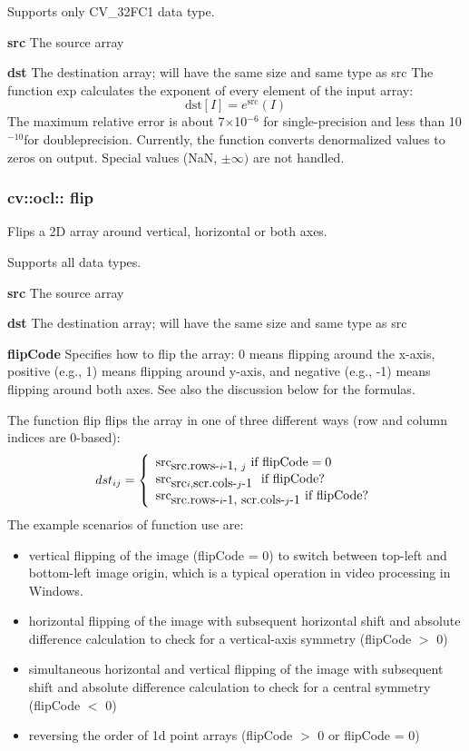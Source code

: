 \documentclass{article}
\begin{document}
Supports only CV{\_}32FC1 data type.

\textbf{src }The source array

\textbf{dst }The destination array; will have the same size and same type as
src The function exp calculates the exponent of every element of the input
array:
\[
\mbox{dst}\left[ I \right]=e^{\mbox{src}}\left( I \right)
\]
The maximum relative error is about 7$\times $10$^{-6}$ for single-precision
and less than 10$^{-10}$for doubleprecision. Currently, the function
converts denormalized values to zeros on output. Special values (NaN, $\pm
\infty )$ are not handled.

\newpage

\subsubsection{cv::ocl:: flip }
\label{subsubsec:mylabel15}
Flips a 2D array around vertical, horizontal or both axes.

Supports all data types.

\textbf{src }The source array

\textbf{dst }The destination array; will have the same size and same type as
src

\textbf{flipCode }Specifies how to flip the array: 0 means flipping around
the x-axis, positive (e.g., 1) means flipping around y-axis, and negative
(e.g., -1) means flipping around both axes. See also the discussion below
for the formulas.

The function flip flips the array in one of three different ways (row and
column indices are 0-based):
\[
dst_{ij} =\left\{ {{\begin{array}{*{20}c}
 {\mbox{src}_{\mbox{src.rows-}i\mbox{-1, }j} \mbox{ if flipCode}=0} \hfill
\\
 {\mbox{src}_{\mbox{src}i,\mbox{scr.cols-}j\mbox{-1 }} \mbox{ if
flipCode}?} \hfill \\
 {\mbox{src}_{\mbox{src.rows-}i\mbox{-1, scr.cols-}j\mbox{-1}} \mbox{ if
flipCode}?} \hfill \\
\end{array} }} \right.
\]
The example scenarios of function use are:

\begin{itemize}
\item vertical flipping of the image (flipCode = 0) to switch between top-left and bottom-left image origin, which is a typical operation in video processing in Windows.
\item horizontal flipping of the image with subsequent horizontal shift and absolute difference calculation to check for a vertical-axis symmetry (flipCode $>$ 0)
\item simultaneous horizontal and vertical flipping of the image with subsequent shift and absolute difference calculation to check for a central symmetry (flipCode $<$ 0)
\item reversing the order of 1d point arrays (flipCode $>$ 0 or flipCode = 0)
\end{itemize}
\end{document}
